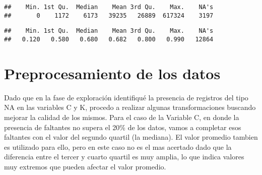 \documentclass[]{article}
\newenvironment{Shaded}{\begin{snugshade}}{\end{snugshade}}
\newcommand{\CommentTok}[1]{\textcolor[rgb]{0.56,0.35,0.01}{\textit{#1}}}
\newcommand{\DataTypeTok}[1]{\textcolor[rgb]{0.13,0.29,0.53}{#1}}
\newcommand{\KeywordTok}[1]{\textcolor[rgb]{0.13,0.29,0.53}{\textbf{#1}}}
\newcommand{\NormalTok}[1]{#1}
\newcommand{\OperatorTok}[1]{\textcolor[rgb]{0.81,0.36,0.00}{\textbf{#1}}}
\newcommand{\OtherTok}[1]{\textcolor[rgb]{0.56,0.35,0.01}{#1}}
\newcommand{\StringTok}[1]{\textcolor[rgb]{0.31,0.60,0.02}{#1}}
\begin{document}
\begin{Shaded}
\end{Shaded}

\begin{verbatim}
##    Min. 1st Qu.  Median    Mean 3rd Qu.    Max.    NA's 
##       0    1172    6173   39235   26889  617324    3197
\end{verbatim}

\begin{Shaded}
\end{Shaded}

\begin{verbatim}
##    Min. 1st Qu.  Median    Mean 3rd Qu.    Max.    NA's 
##   0.120   0.580   0.680   0.682   0.800   0.990   12864
\end{verbatim}

\hypertarget{preprocesamiento-de-los-datos}{%
\section{Preprocesamiento de los
datos}\label{preprocesamiento-de-los-datos}}

Dado que en la fase de exploración identifiqué la presencia de registros
del tipo NA en las variables C y K, procedo a realizar algunas
transformaciones buscando mejorar la calidad de los mismos. Para el caso
de la Variable C, en donde la presencia de faltantes no supera el 20\%
de los datos, vamos a completar esos faltantes con el valor del segundo
quartil (la mediana). El valor promedio tambien es utilizado para ello,
pero en este caso no es el mas acertado dado que la diferencia entre el
tercer y cuarto quartil es muy amplia, lo que indica valores muy
extremos que pueden afectar el valor promedio.

\begin{Shaded}
\end{Shaded}
\end{document}
